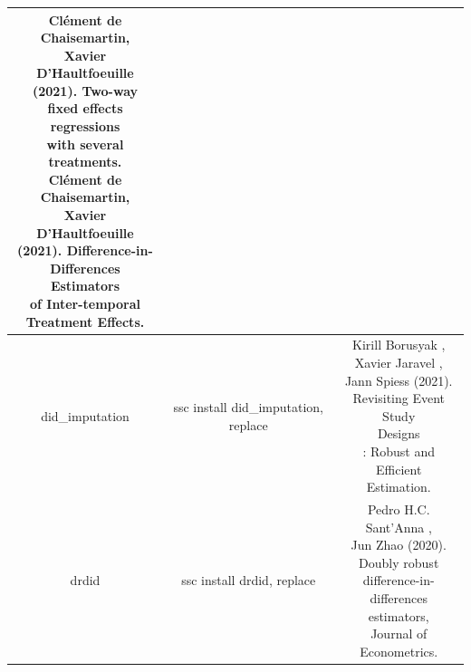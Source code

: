 \documentclass[cn,12pt,math=newtx,citestyle=gb7714-2015,bibstyle=gb7714-2015]{elegantbook}
\makeatletter
\newcommand{\tabincell}[2]{\begin{tabular}{@{}#1@{}}#2\end{tabular}}  %
\makeatother
\begin{document}
\begin{table}[htbp]
\begin{longtable}{|c|c|c|}
{				Clément de Chaisemartin, \\Xavier D'Haultfoeuille \\(2021). Two-way\\ fixed effects regressions\\ with several treatments.\\
				Clément de Chaisemartin, \\Xavier D'Haultfoeuille \\(2021). Difference-in-\\Differences Estimators \\of Inter-temporal \\Treatment Effects.} \\
			\hline
			did\_imputation&	ssc install did\_imputation, replace& \tabincell{c}{Kirill Borusyak , \\Xavier Jaravel , \\Jann Spiess  (2021). \\Revisiting Event Study \\Designs\\: Robust and Efficient \\Estimation.} \\
			\hline
			
			drdid &	ssc install drdid, replace& \tabincell{c}{ Pedro H.C. Sant'Anna ,\\ Jun Zhao (2020).\\ Doubly robust\\ difference-in-\\differences estimators, \\Journal of Econometrics.}\\
			\hline
			
			
		\end{longtable}
	\end{table}
	
\end{document}

